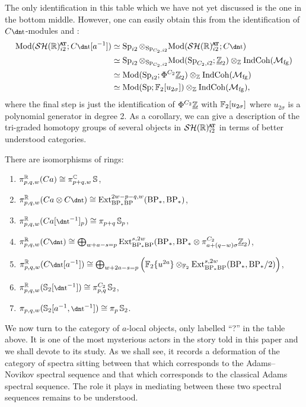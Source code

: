 The only identification in this table which we have not yet discussed is the one in the bottom middle.
However, one can easily obtain this from the identification of $C\ta$-modules and :
\begin{align*}
  \Mod( \SHRat ; C\ta[a^{-1}] ) &\simeq \Sp_{i2} \otimes_{\Sp_{C_2,i2}} \Mod( \SHRat ; C\ta ) \\
  &\simeq \Sp_{i2} \otimes_{\Sp_{C_2,i2}} \Mod(\Sp_{C_2,i2} ; \uZt) \otimes_{\Z} \IndCoh ( \Mfg ) \\
  &\simeq \Mod(\Sp_{i2} ; \Phi^{C_2} \uZt) \otimes_{\Z} \IndCoh ( \Mfg ) \\
  &\simeq \Mod(\Sp ; \F_2[u_{2\sigma}]) \otimes_{\Z} \IndCoh ( \Mfg ) ,
\end{align*}
where the final step is just the identification of $\Phi^{C_2}\underline{\mathbb{Z}}$ with $\operatorname{\mathbb{F}}_2[u_{2\sigma}]$ where $u_{2\sigma}$ is a polynomial generator in degree 2. As a corollary, we can give a description of the tri-graded homotopy groups of several objects in $\SHRat$ in terms of better understood categories.

\begin{cor}
  There are isomorphisms of rings:
  \begin{enumerate}
  \item $\pi_{p,q,w}^{\mathbb{R}}(Ca) \cong \pi_{p+q,w}^{\mathbb{C}}\operatorname{\mathbb{S}} $,
  \item $\pi_{p,q,w}^\R(Ca \otimes C\ta) \cong \Ext_{\BP_*\BP}^{2w-p-q,w}(\BP_*, \BP_*) $,
  \item $\pi_{p,q,w}^\R(Ca[\ta^{-1}]_p) \cong \pi_{p+q}\Ss_p $,
  \item $\pi_{p,q,w}^\R(C\ta) \cong \bigoplus_{w+a-s = p} \Ext_{\BP_*\BP}^{s,2w}(\BP_*, \BP_* \otimes \pi_{a + (q-w) \sigma}^{C_2} \uZt)$,
  \item $\pi_{p,q,w}^\R(C\ta[a^{-1}]) \cong \bigoplus_{w+2a-s = p} \left( \F_2\{u^{2a}\} \otimes_{\F_2} \Ext_{\BP_*\BP}^{s,2w}(\BP_*, \BP_*/2)\right) $,    
  \item $\pi_{p,q,w}^\R(\Ss_2[\ta^{-1}]) \cong \pi_{p,q}^{C_2}\Ss_2$,
  \item $\pi_{p,q,w}(\Ss_2[a^{-1}, \ta^{-1}]) \cong \pi_{p}\Ss_2$.
  \end{enumerate}  
\end{cor}

We now turn to the category of $a$-local objects, only labelled ``?'' in the table above. It is one of the most mysterious actors in the story told in this paper and we shall devote  to its study. As we shall see, it records a deformation of the category of spectra sitting between that which corresponds to the Adams--Novikov spectral sequence and that which corresponds to the classical Adams spectral sequence. The role it plays in mediating between these two spectral sequences remains to be understood.


